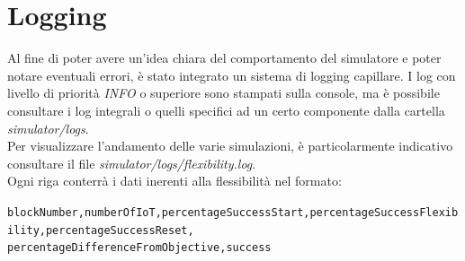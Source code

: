 \section{Logging}

Al fine di poter avere un'idea chiara del comportamento del simulatore e poter notare eventuali errori,
è stato integrato un sistema di logging capillare.
I log con livello di priorità \textit{INFO} o superiore sono stampati sulla console,
ma è possibile consultare i log integrali o quelli specifici ad un certo componente dalla cartella \textit{simulator/logs}. \\
Per visualizzare l'andamento delle varie simulazioni, è particolarmente indicativo consultare il file \textit{simulator/logs/flexibility.log}. \\

Ogni riga conterrà i dati inerenti alla flessibilità nel formato:
\begin{center}
    {\scriptsize
        \texttt{blockNumber,numberOfIoT,percentageSuccessStart,percentageSuccessFlexibility,percentageSuccessReset,\\
        percentageDifferenceFromObjective,success}
    }
\end{center}
